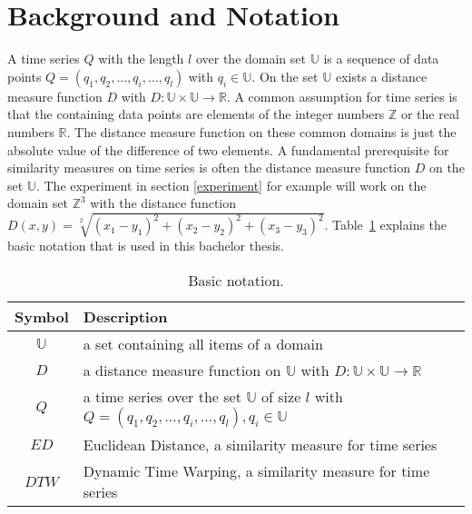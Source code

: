 \section{Background and Notation} \label{background_and_notation}
A time series $Q$ with the length $l$ over the domain set $\mathbb{U}$ is a sequence of data points
$Q = (q_1, q_2, \dots, q_i, \dots, q_l)$ with $q_i \in \mathbb{U}$. On the set $\mathbb{U}$ exists a distance measure
function $D$ with $D: \mathbb{U} \times \mathbb{U} \to \mathbb{R}$. A common assumption for time series is that the
containing data points are elements of the integer numbers $\mathbb{Z}$ or the real numbers $\mathbb{R}$. The distance
measure function on these common domains is just the absolute value of the difference of two elements. A fundamental
prerequisite for similarity measures on time series is often the distance measure function $D$ on the set
$\mathbb{U}$. The experiment in section \ref{experiment} for example will work on the domain set $\mathbb{Z}^3$ with the
distance function $D(x,y) = \sqrt[2]{(x_1-y_1)^2 + (x_2-y_2)^2 + (x_3-y_3)^2}$. Table~\ref{tab:notation} explains the
basic notation that is used in this bachelor thesis.

\begin{table}[H]
    \begin{center}
        \begin{tabularx}{\textwidth}{c X}
            \textbf{Symbol} & \textbf{Description}\\
            \hline
            $\mathbb{U}$ & a set containing all items of a domain\\
            $D$ & a distance measure function on $\mathbb{U}$ with $D: \mathbb{U} \times \mathbb{U} \to \mathbb{R}$\\
            $Q$ & a time series over the set $\mathbb{U}$ of size $l$ with
                $Q = (q_1, q_2, \dots, q_i, \dots, q_l), q_i \in \mathbb{U}$\\
            $ED$ & Euclidean Distance, a similarity measure for time series\\
            $DTW$ & Dynamic Time Warping, a similarity measure for time series\\
        \end{tabularx}
    \end{center}
    \caption{Basic notation.}
	\label{tab:notation}
\end{table}





